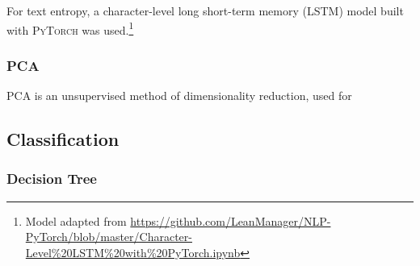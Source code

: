 \documentclass[12pt,a4paper]{article}
\numberwithin{figure}{section}
\numberwithin{table}{section}
\numberwithin{definition}{section}
\begin{document}
For text entropy, a character-level long short-term memory (LSTM) model built with \textsc{PyTorch} was used.\footnote{Model adapted from \url{https://github.com/LeanManager/NLP-PyTorch/blob/master/Character-Level\%20LSTM\%20with\%20PyTorch.ipynb}}

\subsubsection{PCA}
\label{ssec:pca}


PCA is an unsupervised method of dimensionality reduction, used for  


\subsection{Classification}
\label{ssec:classification}



\subsubsection{Decision Tree}
\label{ssec:decisiontree}

\end{document}
